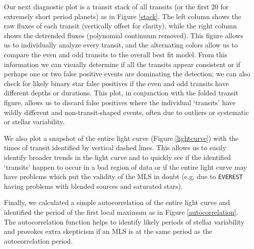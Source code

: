 \documentclass[twocolumn]{aastex62}
\newcommand{\pipeline}[1]{\texttt{#1}}
\begin{document}
Our next diagnostic plot is a transit stack of all transits (or the
first 20 for extremely short period planets) as in Figure
\ref{stack}. The left column shows the raw fluxes of each transit
(vertically offset for clarity), while the right column shows the
detrended fluxes (polynomial continuum removed). This figure allows us
to individually analyze every transit, and the alternating colors
allow us to compare the even and odd transits to the overall best fit
model.  From this information we can visually determine if all the
transits appear consistent or if perhaps one or two false positive
events are dominating the detection; we can also check for likely
binary star false positives if the even and odd transits have
different depths or durations. This plot, in conjunction with the
folded transit figure, allows us to discard false positives where the
individual `transits' have wildly different and non-transit-shaped
events, often due to outliers or systematic or stellar variability.

We also plot a snapshot of the entire light curve (Figure
\ref{lightcurve}) with the times of transit identified by vertical
dashed lines. This allows us to easily identify broader trends in the
light curve and to quickly see if the identified `transits' happen to
occur in a bad region of data or if the entire light curve may have
problems which put the validity of the MLS in doubt (e.g.  due to
\pipeline{EVEREST} having problems with blended sources and saturated
stars).

Finally, we calculated a simple autocorrelation of the entire light
curve and identified the period of the first local maximum as in
Figure \ref{autocorrelation}. The autocorrelation function helps to
identify likely periods of stellar variability and provokes extra
skepticism if an MLS is at the same period as the autocorrelation
period.
\end{document}

